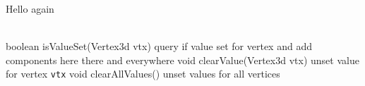 \documentclass{article}
\begin{document}
%
Hello again
%
\begin{methodtable}{0.5}{0.5}
\midline
{}\\
\midline
%
%
{boolean isValueSet(Vertex3d vtx)}%
{query if value set for vertex and add components here there and everywhere}
%
%
{void clearValue(Vertex3d vtx)}%
{unset value for vertex {\tt vtx}}
%
%
{void clearAllValues()}%
{unset values for all vertices}
%
\midline
\end{methodtable}
\end{document}
